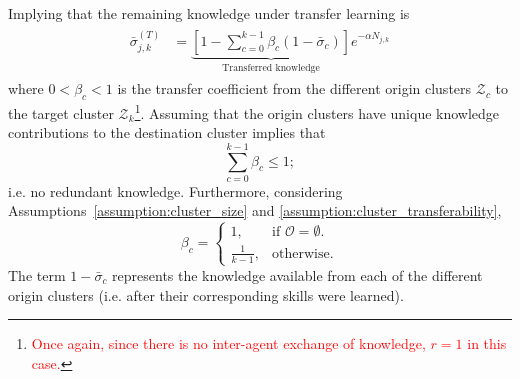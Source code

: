Implying that the remaining knowledge under transfer learning is
\begin{align}
	\begin{split}
		\bar{\sigma}^{(T)}_{j,k} 
		&= \underbrace{\left[1- \sum\limits_{c = 0}^{k-1}\beta_{c} \left( 1 - \bar{\sigma}_{c} \right)\right]}_{\text{Transferred knowledge}} e^{-\alpha N_{j,k}}
	\end{split}
\end{align}
where $0<\beta_{c} < 1$ is the transfer coefficient from the different origin clusters $\mathcal{Z}_{c}$ to the target cluster $\mathcal{Z}_{k}$\footnote{\textcolor{red}{Once again, since there is no inter-agent exchange of knowledge, $ r = 1 $ in this case.}}. Assuming that the origin clusters have unique knowledge contributions to the destination cluster implies that
\begin{equation}
	\sum\limits_{c=0}^{k-1}\beta_{c} \leq 1;
\end{equation}
i.e. no redundant knowledge. Furthermore, considering Assumptions~\ref{assumption:cluster_size} and \ref{assumption:cluster_transferability},
\begin{equation}
	\beta_{c}=
	\begin{cases}
		1, & \text{if $\mathcal{O}  = \emptyset$}.\\
		\frac{1}{k - 1}, & \text{otherwise}.
	\end{cases}
\end{equation}
The term $ 1 - \bar{\sigma}_{c}$ represents the knowledge available from each of the different origin clusters (i.e. after their corresponding skills were learned).


